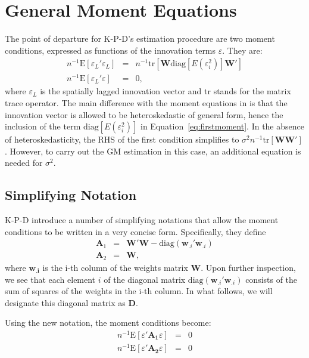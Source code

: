 \documentclass{article}
\begin{document}
\section{General Moment Equations}
The point of departure for K-P-D's estimation procedure are two 
moment conditions, expressed as functions of the innovation terms
$\varepsilon$. They are:
\begin{eqnarray}
 n^{-1} \mbox{E} [\varepsilon_L'\varepsilon_L] &=& n^{-1} \mbox{tr} [ \mathbf{W} \mbox{diag}[E(\varepsilon_i^2)] \mathbf{W'} ] \label{eq:firstmoment}\\ 
 n^{-1} \mbox{E} [\varepsilon_L'\varepsilon] &=& 0,
\end{eqnarray}
where $\varepsilon_L$ is the spatially lagged innovation vector and tr stands for the
matrix trace operator. The main difference
with the moment equations in \cite{KelejianPrucha:99a} is that the innovation vector
is allowed to be heteroskedastic of general form, hence the inclusion of the 
term $\mbox{diag}[E(\varepsilon_i^2)]$ in Equation~\ref{eq:firstmoment}. In the absence of heteroskedasticity, the
RHS of the first condition simplifies to $\sigma^2 n^{-1} \mbox{tr} [\mathbf{WW'}]$. However, to carry out the
GM estimation in this case, an additional equation is needed for $\sigma^2$.

\subsection{Simplifying Notation}\label{ss:simplenotation}
K-P-D introduce a number of simplifying notations that allow the moment conditions to
be written in a very concise form. Specifically, they define
\begin{eqnarray}\label{eq:A1A2}
\mathbf{A}_1 &=& \mathbf{W'W} - \mbox{diag} (\mathbf{w}_{.i}'\mathbf{w}_{.i}) \label{eq:A1}\\
\mathbf{A}_2 &=& \mathbf{W}, \label{eq:A2}
\end{eqnarray}
where $\mathbf{w_{.i}}$ is the i-th column of the weights matrix $\mathbf{W}$. Upon
further inspection, we see that each element $i$ of the diagonal matrix 
$\mbox{diag} (\mathbf{w}_{.i}'\mathbf{w}_{.i})$ consists of the sum of squares of the
weights in the i-th column. In what follows, we will designate this diagonal matrix
as $\mathbf{D}$.

Using the new notation, the moment conditions become:
\begin{eqnarray*}
n^{-1} \mbox{E} [ \varepsilon ' \mathbf{A_1} \varepsilon ] &=& 0\\
n^{-1} \mbox{E} [ \varepsilon ' \mathbf{A_2} \varepsilon ] &=& 0
\end{eqnarray*}
\end{document}
